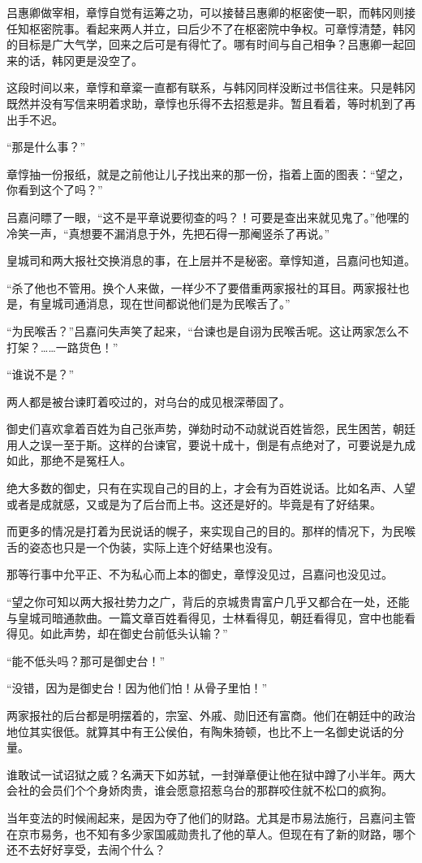 吕惠卿做宰相，章惇自觉有运筹之功，可以接替吕惠卿的枢密使一职，而韩冈则接任知枢密院事。看起来两人并立，曰后少不了在枢密院中争权。可章惇清楚，韩冈的目标是广大气学，回来之后可是有得忙了。哪有时间与自己相争？吕惠卿一起回来的话，韩冈更是没空了。

这段时间以来，章惇和章楶一直都有联系，与韩冈同样没断过书信往来。只是韩冈既然并没有写信来明着求助，章惇也乐得不去招惹是非。暂且看着，等时机到了再出手不迟。

“那是什么事？”

章惇抽一份报纸，就是之前他让儿子找出来的那一份，指着上面的图表：“望之，你看到这个了吗？”

吕嘉问瞟了一眼，“这不是平章说要彻查的吗？！可要是查出来就见鬼了。”他嘿的冷笑一声，“真想要不漏消息于外，先把石得一那阉竖杀了再说。”

皇城司和两大报社交换消息的事，在上层并不是秘密。章惇知道，吕嘉问也知道。

“杀了他也不管用。换个人来做，一样少不了要借重两家报社的耳目。两家报社也是，有皇城司通消息，现在世间都说他们是为民喉舌了。”

“为民喉舌？”吕嘉问失声笑了起来，“台谏也是自诩为民喉舌呢。这让两家怎么不打架？……一路货色！”

“谁说不是？”

两人都是被台谏盯着咬过的，对乌台的成见根深蒂固了。

御史们喜欢拿着百姓为自己张声势，弹劾时动不动就说百姓皆怨，民生困苦，朝廷用人之误一至于斯。这样的台谏官，要说十成十，倒是有点绝对了，可要说是九成如此，那绝不是冤枉人。

绝大多数的御史，只有在实现自己的目的上，才会有为百姓说话。比如名声、人望或者是成就感，又或是为了后台而上书。这还是好的。毕竟是有了好结果。

而更多的情况是打着为民说话的幌子，来实现自己的目的。那样的情况下，为民喉舌的姿态也只是一个伪装，实际上连个好结果也没有。

那等行事中允平正、不为私心而上本的御史，章惇没见过，吕嘉问也没见过。

“望之你可知以两大报社势力之广，背后的京城贵胄富户几乎又都合在一处，还能与皇城司暗通款曲。一篇文章百姓看得见，士林看得见，朝廷看得见，宫中也能看得见。如此声势，却在御史台前低头认输？”

“能不低头吗？那可是御史台！”

“没错，因为是御史台！因为他们怕！从骨子里怕！”

两家报社的后台都是明摆着的，宗室、外戚、勋旧还有富商。他们在朝廷中的政治地位其实很低。就算其中有王公侯伯，有陶朱猗顿，也比不上一名御史说话的分量。

谁敢试一试诏狱之威？名满天下如苏轼，一封弹章便让他在狱中蹲了小半年。两大会社的会员们个个身娇肉贵，谁会愿意招惹乌台的那群咬住就不松口的疯狗。

当年变法的时候闹起来，是因为夺了他们的财路。尤其是市易法施行，吕嘉问主管在京市易务，也不知有多少家国戚勋贵扎了他的草人。但现在有了新的财路，哪个还不去好好享受，去闹个什么？

